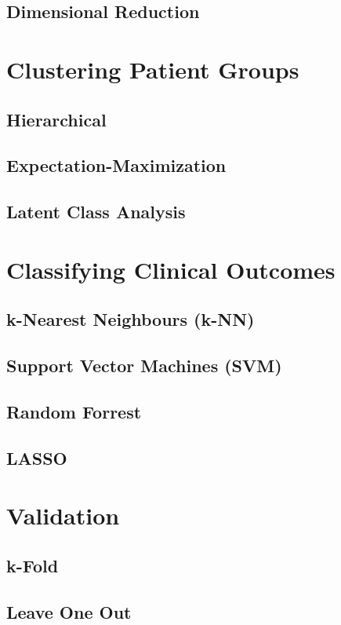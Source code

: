\documentclass[../thesis.tex]{subfiles}
\begin{document}
\noindent 


\subsection{Dimensional Reduction}
\label{subsec:dim_red}

\section{Clustering Patient Groups}
\label{sec:cluster_pat_gro}

\subsection{Hierarchical}
\label{subsec:hierarchical}

\subsection{Expectation-Maximization}
\label{subsec:em}

\subsection{Latent Class Analysis}
\label{subsec:lca}

\section{Classifying Clinical Outcomes}
\label{sec:classify_clin_out}

\subsection{k-Nearest Neighbours (k-NN)}
\label{subsec:knn}

\subsection{Support Vector Machines (SVM)}
\label{subsec:svm}

\subsection{Random Forrest}
\label{subsec:random_forr}

\subsection{LASSO}
\label{subsec:lasso}

\section{Validation}
\label{sec:validation}

\subsection{k-Fold}
\label{subsec:k_fold}

\subsection{Leave One Out}
\label{subsec:loocv}
\end{document}

